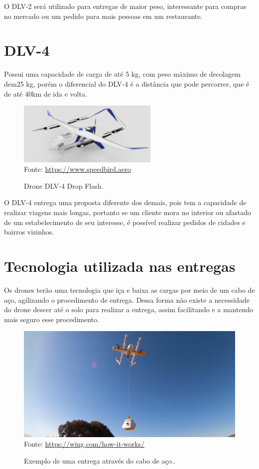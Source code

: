 O DLV-2 será utilizado para entregas de maior peso, interessante para compras no mercado ou um pedido para mais pessoas em um restaurante\cite{Speed2024}.

\section{DLV-4}

Possui uma capacidade de carga de até 5 kg, com peso máximo de decolagem dem25 kg, porém o diferencial do DLV-4 é a distância que pode percorrer, que é de até 40km de ida e volta.

\begin{figure}[!ht]
    \centering
    \caption{Drone DLV-4 Drop Flash.}
    \includegraphics[width=0.6\textwidth]{figuras/dlv 4.png}
    \label{fig:DLV2}\\
    \small Fonte: \url{https://www.speedbird.aero}
\end{figure}


O DLV-4 entrega uma proposta diferente dos demais, pois tem a capacidade de realizar viagens mais longas, portanto se um cliente mora no interior ou afastado de um estabelecimento de seu interesse, é possível realizar pedidos de cidades e bairros vizinhos\cite{Speed2024}.

\section{Tecnologia utilizada nas entregas}

Os drones terão uma tecnologia que iça e baixa as cargas por meio de um cabo de aço, agilizando o procedimento de entrega. Dessa forma não existe a necessidade do drone descer até o solo para realizar a entrega, assim facilitando e a mantendo mais seguro esse procedimento\cite{Wing2024}.

\begin{figure}[!ht]
    \centering
    \caption{Exemplo de uma entrega através do cabo de aço..}
    \includegraphics[width=0.6\linewidth]{figuras/tec utlzd.png}
    \label{fig:DLV2}\\
    \small Fonte: \url{https://wing.com/how-it-works/}
\end{figure}



